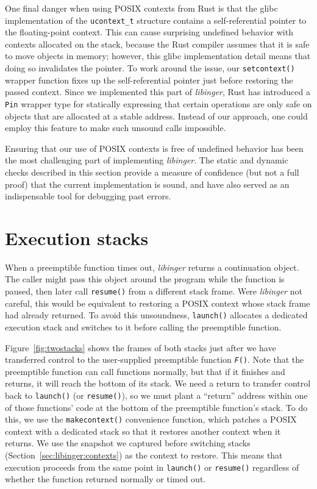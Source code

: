 One final danger when using POSIX contexts from Rust is that the glibc implementation
of the \texttt{ucontext\_t} structure contains a self-referential pointer to the
floating-point context.  This can cause surprising undefined behavior with contexts
allocated on the stack, because the Rust compiler assumes that it is safe to move
objects in memory; however, this glibc implementation detail means that doing so
invalidates the pointer.  To work around the issue, our \texttt{setcontext()} wrapper
function fixes up the self-referential pointer just before restoring the passed
context.  Since we implemented this part of \textit{libinger}, Rust has introduced a
\texttt{Pin} wrapper type for statically expressing that certain operations are only
safe on objects that are allocated at a stable address.  Instead of our approach, one
could employ this feature to make such unsound calls impossible.

Ensuring that our use of POSIX contexts is free of undefined behavior has been the
most challenging part of implementing \textit{libinger}.  The static and dynamic
checks described in this section provide a measure of confidence (but not a full
proof) that the current implementation is sound, and have also served as an
indispensable tool for debugging past errors.


\section{Execution stacks}
\label{sec:libinger:stacks}

When a preemptible function times out, \textit{libinger} returns a continuation
object.  The caller might pass this object around the program while the function is
paused, then later call \texttt{resume()} from a different stack frame.  Were
\textit{libinger} not careful, this would be equivalent to restoring a POSIX context
whose stack frame had already returned.  To avoid this unsoundness, \texttt{launch()}
allocates a dedicated execution stack and switches to it before calling the
preemptible function.

Figure~\ref{fig:twostacks} shows the frames of both stacks just after we have
transferred control to the user-supplied preemptible function \texttt{\textit{F}()}.
Note that the preemptible function can call functions normally, but that if it
finishes and returns, it will reach the bottom of its stack.  We need a return to
transfer control back to \texttt{launch()} (or \texttt{resume()}), so we must plant a
``return'' address within one of those functions' code at the bottom of the
preemptible function's stack.  To do this, we use the \texttt{makecontext()}
convenience function, which patches a POSIX context with a dedicated stack so that it
restores another context when it returns.  We use the snapshot we captured before
switching stacks (Section~\ref{sec:libinger:contexts}) as the context to restore.
This means that execution proceeds from the same point in \texttt{launch()} or
\texttt{resume()} regardless of whether the function returned normally or timed out.


